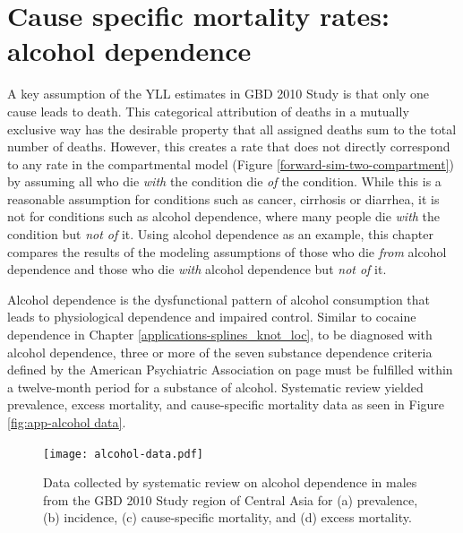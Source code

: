 \chapter{Cause specific mortality rates: alcohol dependence}
\label{applications-csmr}

A key assumption of the YLL estimates in GBD 2010 Study is that only
one cause leads to death.  This categorical attribution of deaths in
a mutually exclusive way has the desirable property that all assigned
deaths sum to the total number of deaths.  However, this
creates a rate that does not directly correspond to any rate in the
compartmental model (Figure \ref{forward-sim-two-compartment}) by
assuming all who die \emph{with} the condition die \emph{of} the
condition.  While this is a reasonable assumption for conditions
such as cancer, cirrhosis or diarrhea, it is not for conditions such as
alcohol dependence, where many people die \emph{with}
the condition but \emph{not of} it.  Using alcohol dependence as an
example, this chapter compares the results of
the modeling assumptions of those who die \emph{from} alcohol dependence
and those who die \emph{with} alcohol dependence but \emph{not of} it.

Alcohol dependence is the dysfunctional pattern of alcohol consumption
that leads to physiological dependence and impaired control.  Similar to
cocaine dependence in Chapter \ref{applications-splines_knot_loc}, to
be diagnosed with alcohol dependence, three or more of the seven
substance dependence criteria defined by the American Psychiatric
Association on page \pageref{page:app-substance_dependence} must be
fulfilled within a twelve-month period for a substance of alcohol.
\cite{american_psychiatric_association_diagnostic_2000, hasin_prevalence_2007}
Systematic review yielded prevalence, excess mortality, and
cause-specific mortality data as seen in Figure \ref{fig:app-alcohol
  data}.

    \begin{figure}[h]
        \begin{center}
            \texttt{[image: alcohol-data.pdf]}
            \caption{Data collected by systematic review on alcohol
              dependence in males from the GBD 2010 Study region of
              Central Asia for (a) prevalence, (b) incidence, (c)
              cause-specific mortality, and (d) excess mortality.}
            \label{fig:app-alcohol data}
        \end{center}
    \end{figure}

